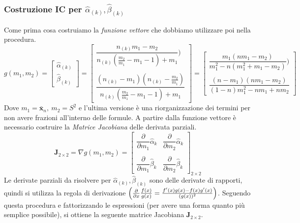 \documentclass[10pt]{article} %
\begin{document}
\subsubsection{Costruzione IC per $\hat{\alpha}_{(k)}, \hat{\beta}_{(k)}$}
Come prima cosa costruiamo la \textit{funzione vettore} che dobbiamo utilizzare poi nella procedura.
\begin{equation}
    g(m_{1}, m_{2}) = 
    \begin{bmatrix}
        \hat{\alpha}_{(k)}\\
        \hat{\beta}_{(k)}
    \end{bmatrix}
    =
    \begin{bmatrix}
        \dfrac{n_{(k)}m_{1}-m_{2}}{n_{(k)}(\frac{m_{2}}{m_{1}}-{m_{1}} -1)+m_{1}})\\\\
        \dfrac{(n_{(k)}-m_{1})(n_{(k)}-\frac{m_{2}}{m_{1}})}{n_{(k)}(\frac{m_{2}}{m_{1}}-m_{1} -1)+m_{1}}
    \end{bmatrix} 
    =
    \begin{bmatrix}
        \dfrac{m_{1}(nm_{1}-m_{2})}{m_{1}^{2}-n(m_{1}^{2}+m_{1}-m_{2})})\\\\
        \dfrac{(n-m_{1})(nm_{1}-m_{2})}{(1-n)m_{1}^{2} - nm_{1} + nm_{2}}
    \end{bmatrix}
\end{equation}
Dove $m_{1}=\bar{\mathbf{x}}_{n},\ m_{2}=S^{2}$ e l'ultima versione è una riorganizzazione dei termini per non avere frazioni all'interno delle formule.
A partire dalla funzione vettore è necessario costruire la \textit{Matrice Jacobiana} delle derivata parziali.
\begin{equation}
    \mathbf{J}_{2\times2} = \nabla g(m_{1}, m_{2}) = 
    \begin{bmatrix}
        \dfrac{\partial}{\partial m_{1}}\hat{\alpha}_{k} & \dfrac{\partial}{\partial m_{2}}\hat{\alpha}_{k}\\ \\
        \dfrac{\partial}{\partial m_{1}}\hat{\beta}_{k} & \dfrac{\partial}{\partial m_{2}}\hat{\beta}_{k}
    \end{bmatrix}_{2\times2}
\end{equation}
Le derivate parziali da risolvere per $\hat{\alpha}_{(k)}, \hat{\beta}_{(k)}$ sono delle derivate di rapporti, quindi si utilizza la regola di derivazione $\Bigl(\frac{\partial}{\partial x}\frac{f(x)}{g(x)} = \frac{f'(x)g(x)-f(x)g'(x)}{(g(x))^{2}} \Bigr)$. Seguendo questa procedura e fattorizzando le espressioni (per avere una forma quanto più semplice possibile), si ottiene la seguente matrice Jacobiana $\mathbf{J}_{2\times2}$. 
\end{document}
